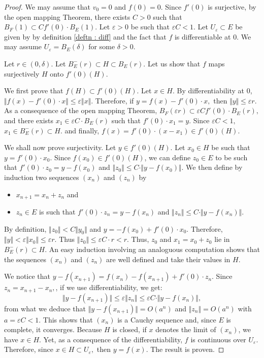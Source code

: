 \documentclass{lms}
\begin{document}
\begin{proof}
We may assume that $v_0=0$ and $f(0)=0$. Since $f'(0)$ is surjective, by 
the open mapping Theorem, there exists $C>0$ such that $B_F(1) \subset 
C  f'(0) \cdot B_E(1)$. Let $\varepsilon>0$ be such that 
$\varepsilon C < 1$. Let $U_\varepsilon \subset E$ be given by by definition \ref{deftn : diff} and the fact that $f$ is differentiable at $0$. We may assume $U_\varepsilon = 
B_E(\delta)$ for some $\delta >0$.

Let $r \in (0, \delta)$. Let $B^-_E(r) \subset H \subset
B_E(r).$
Let us show that $f$ maps surjectively $H$ onto $f'(0) (H)$.

We first prove that $f(H) \subset f'(0) (H)$.
Let $x \in H$. By differentiability at $0$, $\Vert f(x)-f'(0) \cdot x \Vert \leq 
\varepsilon \Vert x \Vert $. Therefore, if $y=f(x)-f'(0) \cdot x,$ then $\Vert y \Vert \leq \varepsilon r$. As a consequence of the open mapping Theorem, $B_F(\varepsilon r) \subset 
\varepsilon C  f'(0) \cdot B_E(r),$ and there exists $x_1 \in \varepsilon C  \cdot B_E(r)$ such that $f'(0) \cdot x_1 =y.$ Since $\varepsilon C <1,$  $x_1 \in B^-_E(r) \subset H.$ and finally, $f(x)= f'(0) \cdot (x-x_1) \in f'(0) (H)$.

We shall now prove surjectivity. Let $y \in f'(0) (H)$.
Let $x_0 \in H$ be such that $y = f'(0) \cdot x_0$. Since $f(x_0) \in f'(0) (H)$, we can define $z_0 \in E$ to be such that $f'(0) \cdot z_0 = y - f(x_0)$ and $\Vert z_0 \Vert \leq C \cdot \Vert y - f(x_0) \Vert$.
We then define by induction two sequences $(x_n)$ and $(z_n)$ by
\begin{itemize}
\item $x_{n+1}=x_n+z_n$ and 
\item $z_n \in E$ is such that
$f'(0) \cdot z_n = y - f(x_n)$ and
$\Vert z_n \Vert \leq C \cdot \Vert y - f(x_n) \Vert$.
\end{itemize}
By definition, $\Vert z_0 \Vert < C \Vert y_0\Vert$ and $y 
= -f(x_0)+f'(0) \cdot x_0$. Therefore, $\Vert y \Vert < \varepsilon 
\Vert x_0 \Vert \leq \varepsilon r$. Thus $\Vert z_0 \Vert \leq 
\varepsilon C \cdot r < r$. Thus, $z_0$ and $x_1=x_0+z_0$  lie in $B^-_E(r) 
\subset H$. An easy induction involving an analoguous computation
shows that the sequences $(x_n)$ and $(z_n)$ are well defined and
take their values in $H$.

We notice that $y - f(x_{n+1}) = f(x_n) - f(x_{n+1}) + f'(0) \cdot z_n$.
Since $z_n=x_{n+1}-x_n,$, if we use differentiability, we get:
$$\Vert y  - f(x_{n+1}) \Vert 
\leq \varepsilon \Vert z_n \Vert \leq \varepsilon C \cdot \Vert 
y - f(x_n) \Vert,$$
from what we deduce that $\Vert y - f(x_{n+1}) \Vert = 
O(a^n)$ and $\Vert z_n \Vert = O(a^n)$ with $a = \varepsilon C < 1$.
This shows that $(x_n)$ is a Cauchy sequence and, since $E$ is complete, it converges. Because $H$ is closed, if $x$ denotes the limit of $(x_n)$, we have $x \in H.$ Yet, as a consequence of the differentiability, $f$ is continuous over $U_\varepsilon.$ Therefore, since $x \in H \subset U_\varepsilon,$ then  $y=f(x)$. The result is proven.
\end{proof}
\end{document}
